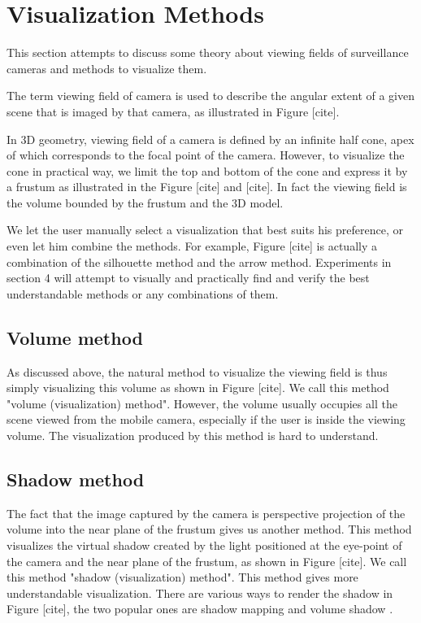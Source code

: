 \chapter{Visualization Methods}
\label{Chapter3}

This section attempts to discuss some theory about viewing fields of surveillance cameras and methods to visualize them.

The term viewing field of camera is used to describe the angular extent of a given scene that is imaged by that camera, as illustrated in Figure [cite].

In 3D geometry, viewing field of a camera is defined by an infinite half cone, apex of which corresponds to the focal point of the camera. However, to visualize the cone in practical way, we limit the top and bottom of the cone and express it by a frustum as illustrated in the Figure [cite] and [cite]. In fact the viewing field is the volume bounded by the frustum and the 3D model.

We let the user manually select a visualization that best suits his preference, or even let him combine the methods. For example, Figure [cite] is actually a combination of the silhouette method and the arrow method. Experiments in section 4 will attempt to visually and practically find and verify the best understandable methods or any combinations of them.

\section{Volume method}

As discussed above, the natural method to visualize the viewing field is thus simply visualizing this volume as shown in Figure [cite]. We call this method "volume (visualization) method". However, the volume usually occupies all the scene viewed from the mobile camera, especially if the user is inside the viewing volume. The visualization produced by this method is hard to understand.

\section{Shadow method}

The fact that the image captured by the camera is perspective projection of the volume into the near plane of the frustum gives us another method. This method visualizes the virtual shadow created by the light positioned at the eye-point of the camera and the near plane of the frustum, as shown in Figure [cite]. We call this method "shadow (visualization) method". This method gives more understandable visualization. There are various ways to render the shadow in Figure [cite], the two popular ones are shadow mapping \citep{Reference7} \citep{Reference8} and volume shadow \citep{Reference9}.

